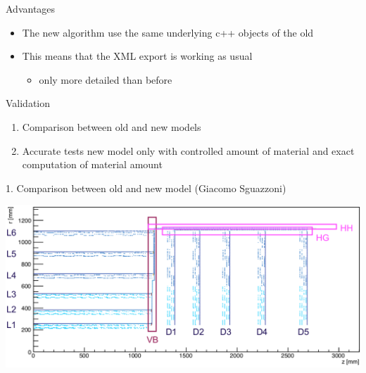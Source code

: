 \documentclass[pdftex, 11pt]{beamer}
\begin{document}
\begin{frame}{Advantages}
  \begin{itemize}
  \item The new algorithm use the \alert{same} underlying c++ objects of the old
  \item This means that the \alert{XML} export is working as usual
    \begin{itemize}
    \item only more \alert{detailed} than before
    \end{itemize}
  \end{itemize}
\end{frame}

\begin{frame}{Validation}
  \begin{enumerate}
  \item \alert{Comparison} between old and new models
  \item Accurate \alert{tests} new model only with controlled amount of material and exact computation of material amount
  \end{enumerate}
\end{frame}

\begin{frame}{1. Comparison between old and new model \fontsize{7}{11}\selectfont (Giacomo Sguazzoni)\normalsize}
  \begin{center}
    \includegraphics[width=\textwidth]{img/sguaz.pdf}
  \end{center}
\end{frame}
\end{document}
